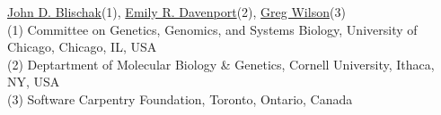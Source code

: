 \href{https://www.authorea.com/users/5990}{John D. Blischak}(1), \href{https://www.authorea.com/users/16152}{Emily R. Davenport}(2), \href{https://www.authorea.com/users/18131}{Greg Wilson}(3)\\

(1) Committee on Genetics, Genomics, and Systems Biology, University of Chicago, Chicago, IL, USA\\
(2) Deptartment of Molecular Biology & Genetics, Cornell University, Ithaca, NY, USA\\
(3) Software Carpentry Foundation, Toronto, Ontario, Canada